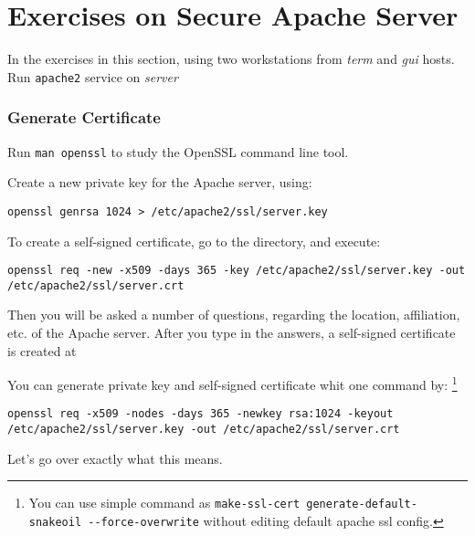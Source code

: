 \documentclass{../UTNetLab}
\begin{document}
\part{Exercises on Secure Apache Server}
    In the exercises in this section, using two workstations from \textit{term} and \textit{gui} hosts. Run \lstinline{apache2} service on \textit{server}

\section{Generate Certificate}
    Run \lstinline{man openssl} to study the OpenSSL command line tool.

    Create a new private key for the Apache server, using:
    \begin{lstlisting}
openssl genrsa 1024 > /etc/apache2/ssl/server.key
    \end{lstlisting}
    To create a self-signed certificate, go to the  directory, and execute:
    \begin{lstlisting}
openssl req -new -x509 -days 365 -key /etc/apache2/ssl/server.key -out /etc/apache2/ssl/server.crt
    \end{lstlisting}
    Then you will be asked a number of questions, regarding the location, affiliation, etc. of the Apache server. After you type in the answers, a self-signed certificate is created at 

    You can generate private key and self-signed certificate whit one command by:
    \footnote{You can use simple command as \lstinline{make-ssl-cert generate-default-snakeoil --force-overwrite} without editing default apache ssl config.}
    \begin{lstlisting}
openssl req -x509 -nodes -days 365 -newkey rsa:1024 -keyout /etc/apache2/ssl/server.key -out /etc/apache2/ssl/server.crt
    \end{lstlisting}

        Let's go over exactly what this means.
\end{document}
